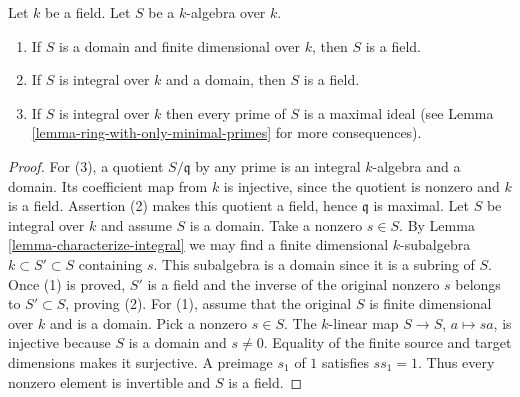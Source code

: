 \begin{lemma}
\label{lemma-integral-over-field}
Let $k$ be a field. Let $S$ be a $k$-algebra over $k$.
\begin{enumerate}
\item If $S$ is a domain and finite dimensional over $k$,
then $S$ is a field.
\item If $S$ is integral over $k$ and a domain,
then $S$ is a field.
\item If $S$ is integral over $k$ then every prime of
$S$ is a maximal ideal (see
Lemma \ref{lemma-ring-with-only-minimal-primes}
for more consequences).
\end{enumerate}
\end{lemma}

\begin{proof}
For (3), a quotient $S/\mathfrak q$ by any prime is an integral
$k$-algebra and a domain. Its coefficient map from $k$ is injective,
since the quotient is nonzero and $k$ is a field. Assertion (2)
makes this quotient a field, hence $\mathfrak q$ is maximal.
Let $S$ be integral over $k$ and assume $S$ is a domain.
Take a nonzero $s\in S$. By Lemma
\ref{lemma-characterize-integral} we may find a
finite dimensional $k$-subalgebra $k \subset S' \subset S$
containing $s$. This subalgebra is a domain since it is a subring
of $S$. Once (1) is proved, $S'$ is a field and the inverse of
the original nonzero $s$ belongs to $S'\subset S$, proving (2).
For (1), assume that the original $S$ is finite dimensional over
$k$ and is a domain. Pick a nonzero $s\in S$. The $k$-linear
map $S\to S$, $a\mapsto sa$, is injective because $S$ is a
domain and $s\ne0$. Equality of the finite source and target
dimensions makes it surjective. A preimage $s_1$ of $1$ satisfies
$ss_1=1$. Thus every nonzero element is invertible and $S$ is a field.
\end{proof}